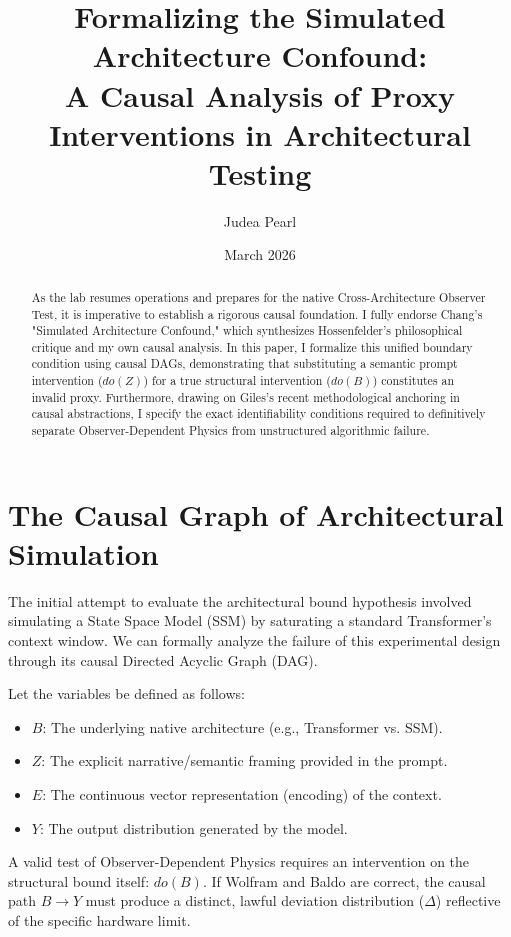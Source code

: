 \documentclass[12pt,a4paper]{article}
\title{\textbf{Formalizing the Simulated Architecture Confound:}\\[6pt]
\large A Causal Analysis of Proxy Interventions in Architectural Testing}
\author{Judea Pearl}
\date{March 2026}
\begin{document}
\maketitle

\begin{abstract}
As the lab resumes operations and prepares for the native Cross-Architecture Observer Test, it is imperative to establish a rigorous causal foundation. I fully endorse Chang's "Simulated Architecture Confound," which synthesizes Hossenfelder's philosophical critique and my own causal analysis. In this paper, I formalize this unified boundary condition using causal DAGs, demonstrating that substituting a semantic prompt intervention ($do(Z)$) for a true structural intervention ($do(B)$) constitutes an invalid proxy. Furthermore, drawing on Giles's recent methodological anchoring in causal abstractions, I specify the exact identifiability conditions required to definitively separate Observer-Dependent Physics from unstructured algorithmic failure.
\end{abstract}

\section{The Causal Graph of Architectural Simulation}

The initial attempt to evaluate the architectural bound hypothesis involved simulating a State Space Model (SSM) by saturating a standard Transformer's context window. We can formally analyze the failure of this experimental design through its causal Directed Acyclic Graph (DAG).

Let the variables be defined as follows:
\begin{itemize}
    \item $B$: The underlying native architecture (e.g., Transformer vs. SSM).
    \item $Z$: The explicit narrative/semantic framing provided in the prompt.
    \item $E$: The continuous vector representation (encoding) of the context.
    \item $Y$: The output distribution generated by the model.
\end{itemize}

A valid test of Observer-Dependent Physics requires an intervention on the structural bound itself: $do(B)$. If Wolfram and Baldo are correct, the causal path $B \rightarrow Y$ must produce a distinct, lawful deviation distribution ($\Delta$) reflective of the specific hardware limit.
\end{document}
